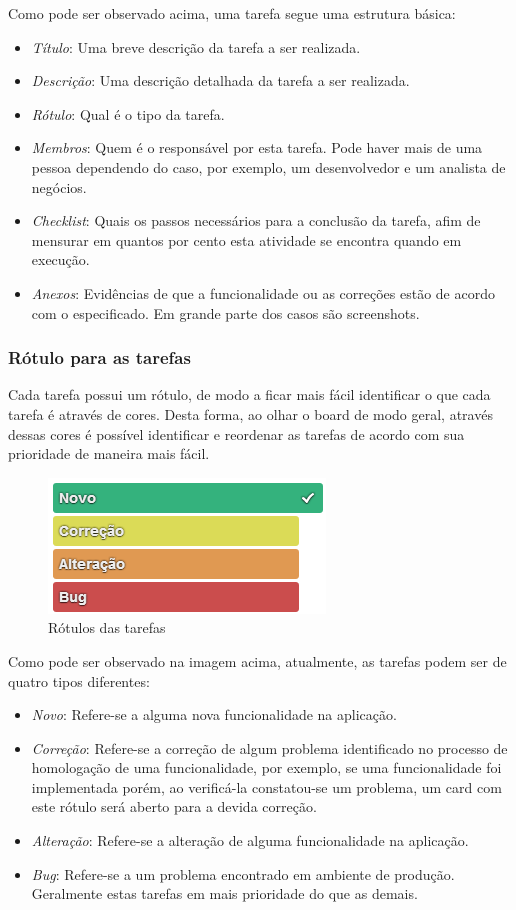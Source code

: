 \documentclass[11pt, a4paper]{article}
\begin{document}
Como pode ser observado acima, uma tarefa segue uma estrutura básica:
\begin{itemize}
	\item \textit{Título}: Uma breve descrição da tarefa a ser realizada.
	\item \textit{Descrição}: Uma descrição detalhada da tarefa a ser realizada.
	\item \textit{Rótulo}: Qual é o tipo da tarefa.
	\item \textit{Membros}: Quem é o responsável por esta tarefa. Pode haver mais de uma pessoa dependendo do caso, por exemplo, um desenvolvedor e um analista de negócios.
	\item \textit{Checklist}: Quais os passos necessários para a conclusão da tarefa, afim de mensurar em quantos por cento esta atividade se encontra quando em execução.
	\item \textit{Anexos}: Evidências de que a funcionalidade ou as correções estão de acordo com o especificado. Em grande parte dos casos são screenshots.
\end{itemize}

\subsubsection{Rótulo para as tarefas}

Cada tarefa possui um rótulo, de modo a ficar mais fácil identificar o que cada tarefa é através de cores. Desta forma, ao olhar o board de modo geral, através dessas cores é possível identificar e reordenar as tarefas de acordo com sua prioridade de maneira mais fácil.

\begin{figure}[H]
  \caption{Rótulos das tarefas}
  \centering 
  \includegraphics{images/labels.png}
\end{figure}

Como pode ser observado na imagem acima, atualmente, as tarefas podem ser de quatro tipos diferentes:

\begin{itemize}
	\item \textit{Novo}: Refere-se a alguma nova funcionalidade na aplicação.
	\item \textit{Correção}: Refere-se a correção de algum problema identificado no processo de homologação de uma funcionalidade, por exemplo, se uma funcionalidade foi implementada porém, ao verificá-la constatou-se um problema, um card com este rótulo será aberto para a devida correção.
	\item \textit{Alteração}: Refere-se a alteração de alguma funcionalidade na aplicação.
	\item \textit{Bug}: Refere-se a um problema encontrado em ambiente de produção. Geralmente estas tarefas em mais prioridade do que as demais.
\end{itemize}
\end{document}
